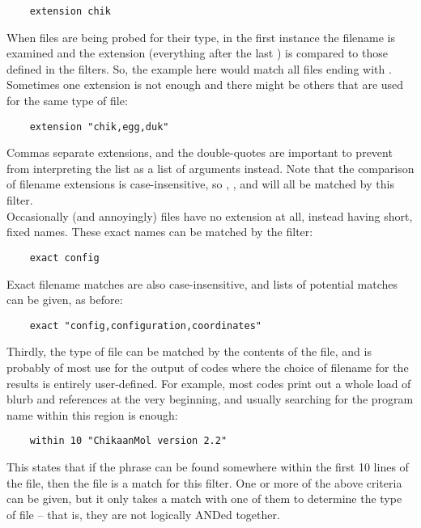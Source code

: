 \begin{verbatim}
	extension chik
\end{verbatim}

When files are being probed for their type, in the first instance the filename is examined and the extension (everything after the last ) is compared to those defined in the filters. So, the example here would match all files ending with . Sometimes one extension is not enough and there might be others that are used for the same type of file:

\begin{verbatim}
	extension "chik,egg,duk"
\end{verbatim}

Commas separate extensions, and the double-quotes are important to prevent \progname{} from interpreting the list as a list of arguments instead. Note that the comparison of filename extensions is case-insensitive, so , , and  will all be matched by this filter.\\

Occasionally (and annoyingly) files have no extension at all, instead having short, fixed names. These exact names can be matched by the filter:

\begin{verbatim}
	exact config
\end{verbatim}

Exact filename matches are also case-insensitive, and lists of potential matches can be given, as before:

\begin{verbatim}
	exact "config,configuration,coordinates"
\end{verbatim}

Thirdly, the type of file can be matched by the contents of the file, and is probably of most use for the output of codes where the choice of filename for the results is entirely user-defined. For example, most codes print out a whole load of blurb and references at the very beginning, and usually searching for the program name within this region is enough:

\begin{verbatim}
	within 10 "ChikaanMol version 2.2"
\end{verbatim}

This states that if the phrase  can be found somewhere within the first 10 lines of the file, then the file is a match for this filter. One or more of the above criteria can be given, but it only takes a match with one of them to determine the type of file -- that is, they are not logically ANDed together.\\

